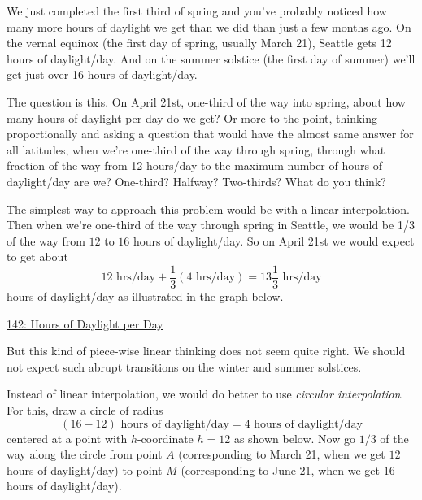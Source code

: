 \documentclass{ximera}
\begin{document}
\begin{example}  \label{Ex:LLL}
We just completed the first third of spring and you've probably noticed how many more hours of daylight we get than we did than just a few months ago. On the vernal equinox (the first day of spring, usually March 21), Seattle gets 12 hours of daylight/day. And on the summer solstice (the first day of summer) we'll get just over 16 hours of daylight/day. 

The question is this. On April 21st, one-third of the way into spring, about how many hours of daylight per day do we get? Or more to the point, thinking proportionally and asking a question that would have the almost same answer for all latitudes, when we're one-third of the way through spring, through what fraction of the way from 12 hours/day to the maximum number of hours of daylight/day are we? One-third? Halfway? Two-thirds? What do you think?

The simplest way to approach this problem would be with a linear interpolation. Then when we're one-third of the way through spring in Seattle, we would be 1/3 of the way from $12$ to $16$ hours of daylight/day. So on April 21st we would expect to get about
\[
    12 \text{ hrs/day} + \frac{1}{3}(4 \text{ hrs/day}) = 13 \frac{1}{3}\text{ hrs/day}
\]
hours of daylight/day as illustrated in the graph below.


\begin{onlineOnly}
    \begin{center}
\end{center}
\end{onlineOnly}

\href{https://www.desmos.com/calculator/esj3yytaug}{142: Hours of Daylight per Day}

But this kind of piece-wise linear thinking does not seem quite right. We should not expect such abrupt transitions on the winter and summer solstices.

Instead of linear interpolation, we would do better to use \emph{circular interpolation}. For this, draw a circle of radius 
\[
     (16 - 12) \text{ hours of daylight/day} = 4 \text{ hours of daylight/day}
\]
centered at a point with $h$-coordinate $h=12$ as shown below. Now go $1/3$ of the way along the circle from point $A$ (corresponding to March 21, when we get $12$ hours of daylight/day) to point $M$ (corresponding to June 21, when we get $16$ hours of daylight/day).

 
\begin{onlineOnly}
    \begin{center}
\end{center}
\end{onlineOnly}


\end{example}
\end{document}
